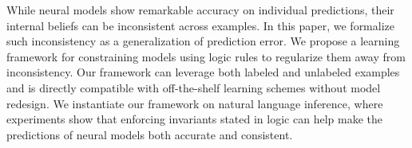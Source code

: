While neural models show remarkable accuracy on individual predictions, their
internal beliefs can be inconsistent across examples. In this paper,
we formalize such inconsistency as a generalization of prediction error. We
propose a learning framework for constraining models using logic rules to
regularize them away from inconsistency. Our framework can leverage both
labeled and unlabeled examples and is directly compatible with off-the-shelf
learning schemes without model redesign.  We instantiate our framework on
natural language inference, where experiments show that enforcing invariants
stated in logic can help make the predictions of neural models both accurate
and consistent.